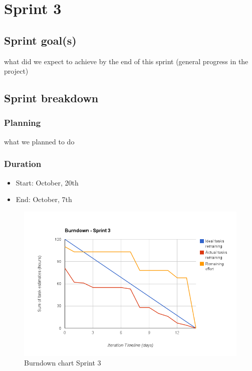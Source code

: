 

\chapter{Sprint 3}
\label{Sprint0}

\section{Sprint goal(s)}
what did we expect to achieve by the end of this sprint (general progress in the project)
\section{Sprint breakdown}
\subsection{Planning}
what we planned to do
\subsection{Duration}

\begin{itemize}
\item Start: October, 20th
\item End: October, 7th
\end{itemize}

\begin{figure}[H]
\centering
\includegraphics[scale=0.60]{../Figures/burndownSprint3.png}
\caption{Burndown chart Sprint 3}
\label{figure:burndownsprint3}
\end{figure}

